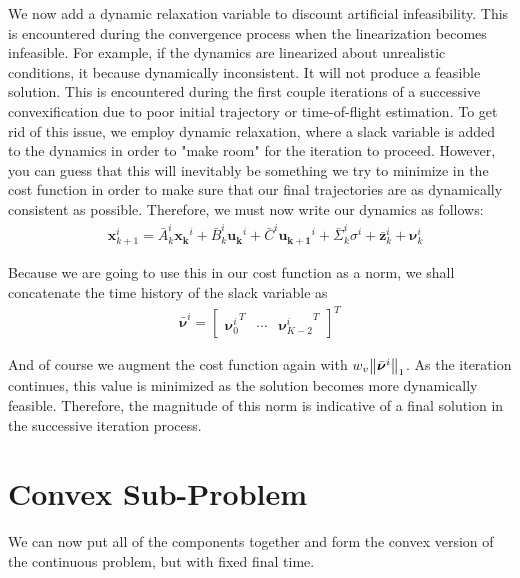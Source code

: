 We now add a dynamic relaxation variable to discount artificial infeasibility. This is encountered during the convergence process when the linearization becomes infeasible. For example, if the dynamics are linearized about unrealistic conditions, it because dynamically inconsistent. It will not produce a feasible solution. This is encountered during the first couple iterations of a successive convexification due to poor initial trajectory or time-of-flight estimation. To get rid of this issue, we employ dynamic relaxation, where a slack variable is added to the dynamics in order to "make room" for the iteration to proceed. However, you can guess that this will inevitably be something we try to minimize in the cost function in order to make sure that our final trajectories are as dynamically consistent as possible. Therefore, we must now write our dynamics as follows: 
%
\begin{align}
& \mathbf{x}_{k+1}^i = \bar{A}_k^i\mathbf{x_k}^i + \bar{B}_k^i\mathbf{u_k}^i + \bar{C}^i\mathbf{u_{k+1}}^i + \bar{\Sigma}_k^i\sigma^i + \bar{\mathbf{z}}^i_k + \bm{\nu}_k^i
\end{align}

Because we are going to use this in our cost function as a norm, we shall concatenate the time history of the slack variable as
\begin{align}
\bar{\bm{\nu}}^i = 
	\begin{bmatrix}
	{\bm{\nu}_0^i}^T & \cdots & {\bm{\nu}^i_{K-2}}^T 
	\end{bmatrix}^T
\end{align}

And of course we augment the cost function again with $w_v \norm{\bar{\bm{\nu}}^i}_1$. As the iteration continues, this value is minimized as the solution becomes more dynamically feasible. Therefore, the magnitude of this norm is indicative of a final solution in the successive iteration process.

\section{Convex Sub-Problem}
We can now put all of the components together and form the convex version of the continuous problem, but with fixed final time.

